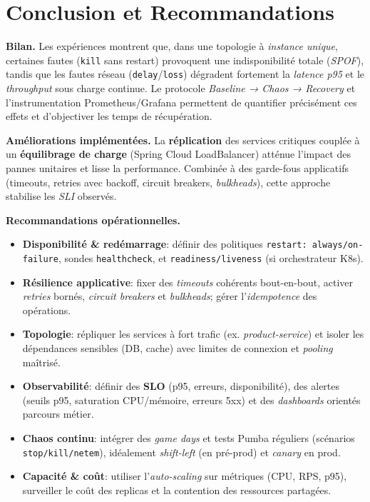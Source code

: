 \chapter*{Conclusion et Recommandations}

\textbf{Bilan.}
Les expériences montrent que, dans une topologie à \textit{instance unique}, certaines fautes (\texttt{kill} sans restart) provoquent une indisponibilité totale (\textit{SPOF}), tandis que les fautes réseau (\texttt{delay}/\texttt{loss}) dégradent fortement la \textit{latence p95} et le \textit{throughput} sous charge continue. 
Le protocole \textit{Baseline → Chaos → Recovery} et l'instrumentation Prometheus/Grafana permettent de quantifier précisément ces effets et d'objectiver les temps de récupération.

\textbf{Améliorations implémentées.}
La \textbf{réplication} des services critiques couplée à un \textbf{équilibrage de charge} (Spring Cloud LoadBalancer) atténue l'impact des pannes unitaires et lisse la performance. 
Combinée à des garde-fous applicatifs (timeouts, retries avec backoff, circuit breakers, \textit{bulkheads}), cette approche stabilise les \textit{SLI} observés.

\textbf{Recommandations opérationnelles.}
\begin{itemize}
  \item \textbf{Disponibilité \& redémarrage}: définir des politiques \texttt{restart: always/on-failure}, sondes \texttt{healthcheck}, et \texttt{readiness/liveness} (si orchestrateur K8s).
  \item \textbf{Résilience applicative}: fixer des \textit{timeouts} cohérents bout-en-bout, activer \textit{retries} bornés, \textit{circuit breakers} et \textit{bulkheads}; gérer l'\textit{idempotence} des opérations.
  \item \textbf{Topologie}: répliquer les services à fort trafic (ex. \textit{product-service}) et isoler les dépendances sensibles (DB, cache) avec limites de connexion et \textit{pooling} maîtrisé.
  \item \textbf{Observabilité}: définir des \textbf{SLO} (p95, erreurs, disponibilité), des alertes (seuils p95, saturation CPU/mémoire, erreurs 5xx) et des \textit{dashboards} orientés parcours métier.
  \item \textbf{Chaos continu}: intégrer des \textit{game days} et tests Pumba réguliers (scénarios \texttt{stop/kill/netem}), idéalement \textit{shift-left} (en pré-prod) et \textit{canary} en prod.
  \item \textbf{Capacité \& coût}: utiliser l’\textit{auto-scaling} sur métriques (CPU, RPS, p95), surveiller le coût des replicas et la contention des ressources partagées.
\end{itemize}

